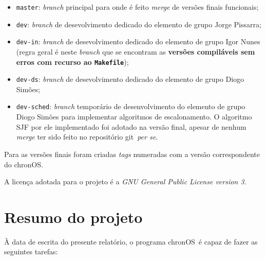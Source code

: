 \documentclass[10pt,oneside]{estiloUBI}
\newcommand{\chronOS}{\textsf{chronOS}}
\newcommand{\git}{\textsf{git}}
\begin{document}
	\begin{itemize}
		\item \texttt{master}: \textit{branch} principal para onde é feito \textit{merge} de versões finais funcionais;
		\item \texttt{dev}: \textit{branch} de desevolvimento dedicado do elemento de grupo Jorge Pissarra;
		\item \texttt{dev-in}: \textit{branch} de desevolvimento dedicado do elemento de grupo Igor Nunes (regra geral é neste \textit{branch} que se encontram as \textbf{versões compiláveis sem erros com recurso ao \texttt{Makefile}});
		\item \texttt{dev-ds}: \textit{branch} de desevolvimento dedicado do elemento de grupo Diogo Simões;
		\item \texttt{dev-sched}: \textit{branch} temporário de desenvolvimento do elemento de grupo Diogo Simões para implementar algoritmos de escalonamento. O algoritmo \ac{SJF} por ele implementado foi adotado na versão final, apesar de nenhum \textit{merge} ter sido feito no repositório \git~\textit{per se}.
	\end{itemize}

	Para as versões finais foram criadas \textit{tags} numeradas com a versão correspondente do \chronOS.
	
	A licença adotada para o projeto é a \textit{GNU General Public License version 3}.
	

	\section{Resumo do projeto}
	\label{ssec:dev:summary}
	
	À data de escrita do presente relatório, o programa \chronOS~é capaz de fazer as seguintes tarefas:
	
\end{document}
